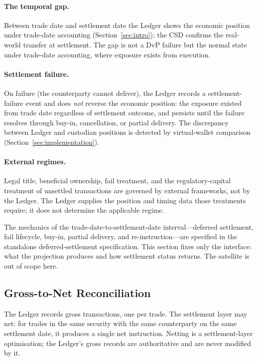 \paragraph{The temporal gap.} Between trade date and settlement date the Ledger shows the economic position under trade-date accounting (Section~\ref{sec:intro}); the CSD confirms the real-world transfer at settlement. The gap is not a DvP failure but the normal state under trade-date accounting, where exposure exists from execution.

\paragraph{Settlement failure.} On failure (the counterparty cannot deliver), the Ledger records a settlement-failure event and does \emph{not} reverse the economic position: the exposure existed from trade date regardless of settlement outcome, and persists until the failure resolves through buy-in, cancellation, or partial delivery. The discrepancy between Ledger and custodian positions is detected by virtual-wallet comparison (Section~\ref{sec:implementation}).

\paragraph{External regimes.} Legal title, beneficial ownership, fail treatment, and the regulatory-capital treatment of unsettled transactions are governed by external frameworks, not by the Ledger. The Ledger supplies the position and timing data those treatments require; it does not determine the applicable regime.

\begin{remark}
The mechanics of the trade-date-to-settlement-date interval---deferred settlement, fail lifecycle, buy-in, partial delivery, and re-instruction---are specified in the standalone deferred-settlement specification. This section fixes only the interface: what the projection produces and how settlement status returns. The satellite is out of scope here.
\end{remark}

\subsection{Gross-to-Net Reconciliation}
\label{sec:settlement-netting}

The Ledger records gross transactions, one per trade. The settlement layer may net: for trades in the same security with the same counterparty on the same settlement date, it produces a single net instruction. Netting is a settlement-layer optimisation; the Ledger's gross records are authoritative and are never modified by it.

